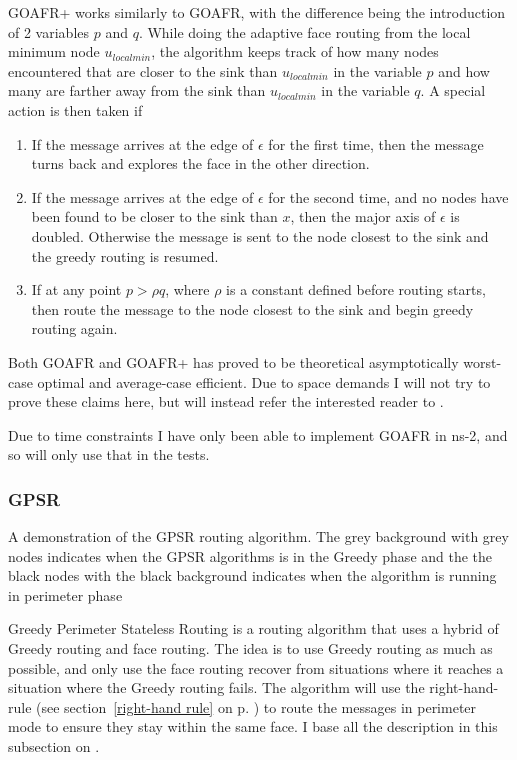 GOAFR+ works similarly to GOAFR, with the difference being the introduction of 2 variables $p$ and $q$. While doing the adaptive face routing from the local minimum node $u_{local min}$, the algorithm keeps track of how many nodes encountered that are closer to the sink than $u_{local min}$ in the variable $p$ and how many are farther away from the sink than $u_{local min}$ in the variable $q$.
A special action is then taken if
\begin{enumerate}
\item If the message arrives at the edge of $\epsilon$ for the first time, then the message turns back and explores the face in the other direction. 
\item If the message arrives at the edge of $\epsilon$ for the second time, and no nodes have been found to be closer to the sink than $x$, then the major axis of $\epsilon$ is doubled. Otherwise the message is sent to the node closest to the sink and the greedy routing is resumed.
\item If at any point $p > \rho q$, where $\rho$ is a constant defined before routing starts, then route the message to the node closest to the sink and begin greedy routing again.
\end{enumerate}

Both GOAFR and GOAFR+ has proved to be theoretical asymptotically worst-case optimal and average-case efficient. Due to space demands I will not try to prove these claims here, but will instead refer the interested reader to \cite{gopher+, gopher}.

Due to time constraints I have only been able to implement GOAFR in ns-2, and so will only use that in the tests.

\subsubsection{GPSR}
{A demonstration of the GPSR routing algorithm. The grey background with grey nodes indicates when the GPSR algorithms is in the Greedy phase and the the black nodes with the black background indicates when the algorithm is running in perimeter phase}

\label{section:gpsr}
Greedy Perimeter Stateless Routing is a routing algorithm that uses a hybrid of Greedy routing and face routing. The idea is to use Greedy routing as much as possible, and only use the face routing recover from situations where it reaches a situation where the Greedy routing fails. The algorithm will use the right-hand-rule (see section~\ref{right-hand rule} on p. \pageref{right-hand rule}) to route the messages in perimeter mode to ensure they stay within the same face. I base all the description in this subsection on \cite{gpsr}.

